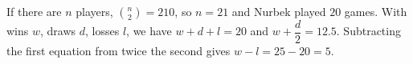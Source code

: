 If there are $n$ players, $\binom n2=210$, so $n=21$ and Nurbek played $20$ games. With wins $w$, draws $d$, losses $l$, we have $w+d+l=20$ and $w+\dfrac{d}{2}=12.5$. Subtracting the first equation from twice the second gives $w-l=25-20=\boxed5$.
